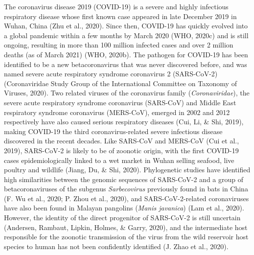 \documentclass[12pt,twoside,openany,\mydriver]{thesis}  %
\begin{document}
The coronavirus disease 2019 (COVID-19) is a severe and highly infectious respiratory disease whose first known case appeared in late December 2019 in Wuhan, China (Zhu et al., 2020). Since then, COVID-19 has quickly evolved into a global pandemic within a few months by March 2020 (WHO, 2020c) and is still ongoing, resulting in more than 100 million infected cases and over 2 million deaths (as of March 2021) (WHO, 2020b). The pathogen for COVID-19 has been identified to be a new betacoronavirus that was never discovered before, and was named severe acute respiratory syndrome coronavirus 2 (SARS-CoV-2) (Coronaviridae Study Group of the International Committee on Taxonomy of Viruses, 2020). Two related viruses of the coronavirus family (\emph{Coronaviridae}), the severe acute respiratory syndrome coronavirus (SARS-CoV) and Middle East respiratory syndrome coronavirus (MERS-CoV), emerged in 2002 and 2012 respectively have also caused serious respiratory diseases (Cui, Li, \& Shi, 2019), making COVID-19 the third coronavirus-related severe infectious disease discovered in the recent decades. Like SARS-CoV and MERS-CoV (Cui et al., 2019), SARS-CoV-2 is likely to be of zoonotic origin, with the first COVID-19 cases epidemiologically linked to a wet market in Wuhan selling seafood, live poultry and wildlife (Jiang, Du, \& Shi, 2020). Phylogenetic studies have identified high similarities between the genomic sequences of SARS-CoV-2 and a group of betacoronaviruses of the subgenus \emph{Sarbecovirus} previously found in bats in China (F. Wu et al., 2020; P. Zhou et al., 2020), and SARS-CoV-2-related coronaviruses have also been found in Malayan pangolins (\emph{Manis javanica}) (Lam et al., 2020). However, the identity of the direct progenitor of SARS-CoV-2 is still uncertain (Andersen, Rambaut, Lipkin, Holmes, \& Garry, 2020), and the intermediate host responsible for the zoonotic transmission of the virus from the wild reservoir host species to human has not been confidently identified (J. Zhao et al., 2020).
\end{document}
